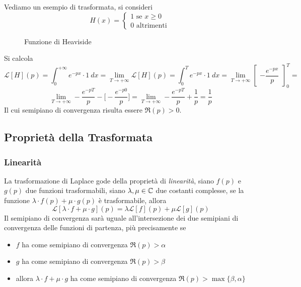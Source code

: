 \documentclass[10pt, letterpaper]{report}
\begin{document}
 Vediamo un esempio di trasformata, si consideri $$ 
 H(x)=\begin{cases}
    1 \text{ se }x\ge 0\\ 0 \text{ altrimenti }
 \end{cases}
 $$
 \begin{center}
 \begin{figure}[h!]
    \centering
        \caption{Funzione di Heaviside}
\end{figure}
\end{center}
Si calcola 
$$ \mathcal{L}[H](p)=\int_0^{+\infty}e^{-px}\cdot 1 \ dx = 
\lim_{T\rightarrow+\infty}\mathcal{L}[H](p)=\int_0^{T}e^{-px}\cdot 1 \ dx = 
\lim_{T\rightarrow+\infty}\begin{bmatrix}
    -\dfrac{e^{-px}}{p}
\end{bmatrix}_0^T=$$
$$\lim_{T\rightarrow+\infty} -\dfrac{e^{-pT}}{p} - \Big[-\dfrac{e^{-p0}}{p}\Big] =  
\lim_{T\rightarrow+\infty} -\dfrac{e^{-pT}}{p} +\dfrac{1}{p}=\frac{1}{p}$$
Il cui semipiano di convergenza risulta essere $\Re(p)>0$.
\subsection{Proprietà della Trasformata}
\subsubsection{Linearità}
La trasformazione di Laplace gode della proprietà di \textit{linearità}, siano $f(p)$ e $g(p)$ due funzioni 
trasformabili, siano $\lambda,\mu \in {\mathbb C}$ due costanti complesse, se la funzione 
$\lambda \cdot f(p)+\mu \cdot g(p)$ è trasformabile, allora 
$$ 
\mathcal{L}[\lambda \cdot f+\mu \cdot g](p)=\lambda\mathcal{L}[f](p)+\mu\mathcal{L}[g](p)
$$
Il semipiano di convergenza sarà uguale all'intersezione dei due semipiani di convergenza delle funzioni 
di partenza, più precisamente se \begin{itemize}
    \item $f$ ha come semipiano di convergenza $\Re(p)>\alpha$
    \item $g$ ha come semipiano di convergenza $\Re(p)>\beta$
    \item allora $\lambda \cdot f+\mu \cdot g$ ha come semipiano di convergenza $\Re(p)>\max\{\beta,\alpha\}$
\end{itemize}
\end{document}
